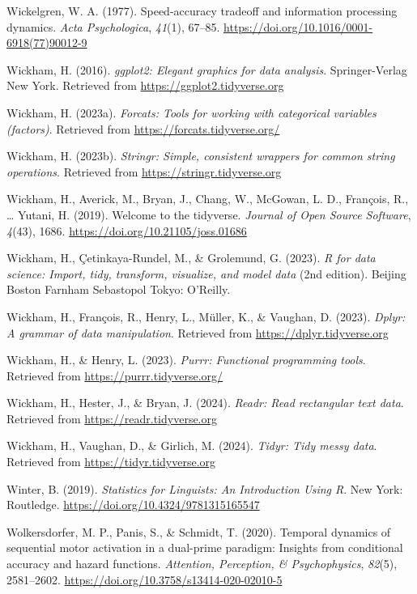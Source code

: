 \documentclass[
  man, donotrepeattitle,floatsintext]{apa6}
\newlength{\cslhangindent}
\newenvironment{CSLReferences}[2] %
 {\begin{list}{}{%
  \setlength{\itemindent}{0pt}
  \setlength{\leftmargin}{0pt}
  \setlength{\parsep}{0pt}
  \ifodd #1
   \setlength{\leftmargin}{\cslhangindent}
   \setlength{\itemindent}{-1\cslhangindent}
  \fi
  \setlength{\itemsep}{#2\baselineskip}}}
 {\end{list}}
\begin{document}
\begin{CSLReferences}{1}{0}
Wickelgren, W. A. (1977). Speed-accuracy tradeoff and information processing dynamics. \emph{Acta Psychologica}, \emph{41}(1), 67--85. \url{https://doi.org/10.1016/0001-6918(77)90012-9}

Wickham, H. (2016). \emph{ggplot2: Elegant graphics for data analysis}. Springer-Verlag New York. Retrieved from \url{https://ggplot2.tidyverse.org}

Wickham, H. (2023a). \emph{Forcats: Tools for working with categorical variables (factors)}. Retrieved from \url{https://forcats.tidyverse.org/}

Wickham, H. (2023b). \emph{Stringr: Simple, consistent wrappers for common string operations}. Retrieved from \url{https://stringr.tidyverse.org}

Wickham, H., Averick, M., Bryan, J., Chang, W., McGowan, L. D., François, R., \ldots{} Yutani, H. (2019). Welcome to the {tidyverse}. \emph{Journal of Open Source Software}, \emph{4}(43), 1686. \url{https://doi.org/10.21105/joss.01686}

Wickham, H., Çetinkaya-Rundel, M., \& Grolemund, G. (2023). \emph{R for data science: Import, tidy, transform, visualize, and model data} (2nd edition). Beijing Boston Farnham Sebastopol Tokyo: O'Reilly.

Wickham, H., François, R., Henry, L., Müller, K., \& Vaughan, D. (2023). \emph{Dplyr: A grammar of data manipulation}. Retrieved from \url{https://dplyr.tidyverse.org}

Wickham, H., \& Henry, L. (2023). \emph{Purrr: Functional programming tools}. Retrieved from \url{https://purrr.tidyverse.org/}

Wickham, H., Hester, J., \& Bryan, J. (2024). \emph{Readr: Read rectangular text data}. Retrieved from \url{https://readr.tidyverse.org}

Wickham, H., Vaughan, D., \& Girlich, M. (2024). \emph{Tidyr: Tidy messy data}. Retrieved from \url{https://tidyr.tidyverse.org}

Winter, B. (2019). \emph{Statistics for {Linguists}: {An Introduction Using R}}. New York: Routledge. \url{https://doi.org/10.4324/9781315165547}

Wolkersdorfer, M. P., Panis, S., \& Schmidt, T. (2020). Temporal dynamics of sequential motor activation in a dual-prime paradigm: {Insights} from conditional accuracy and hazard functions. \emph{Attention, Perception, \& Psychophysics}, \emph{82}(5), 2581--2602. \url{https://doi.org/10.3758/s13414-020-02010-5}

\end{CSLReferences}
\end{document}
